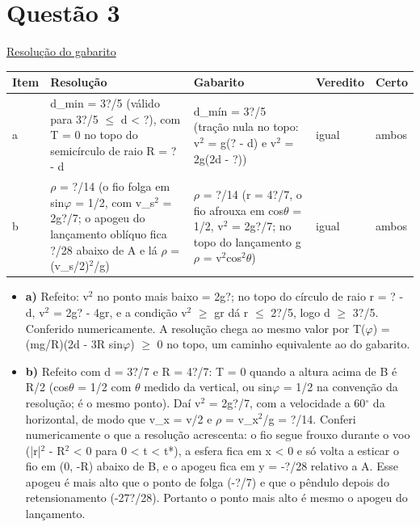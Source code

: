 \documentclass{article}%
\begin{document}
\section*{Questão 3}%
\href{https://poliedroresolve.sistemapoliedro.com.br/vestibulares/ime/2026/ime-2-fase-dia-2-24-10-2025-2-fase-dia-2/dissertativa-3-fisica-2-fase-dia-2-ime-2026}{Resolução do gabarito}\par\smallskip%
\begin{longtable}{@{}p{} p{} p{} p{} p{}@{}}\toprule Item & Resolução & Gabarito & Veredito & Certo \\ \midrule
a & d\_min = 3?/5 (válido para 3?/5 $\leq$ d < ?), com T = 0 no topo do semicírculo de raio R = ? - d & d\_mín = 3?/5 (tração nula no topo: v$^2$ = g(? - d) e v$^2$ = 2g(2d - ?)) & igual & ambos \\
b & $\rho$ = ?/14 (o fio folga em sin$\varphi$ = 1/2, com v\_s$^2$ = 2g?/7; o apogeu do lançamento oblíquo fica ?/28 abaixo de A e lá $\rho$ = (v\_s/2)$^2$/g) & $\rho$ = ?/14 (r = 4?/7, o fio afrouxa em cos$\theta$ = 1/2, v$^2$ = 2g?/7; no topo do lançamento g$\rho$ = v$^2$cos$^2$$\theta$) & igual & ambos \\
\bottomrule\end{longtable}%
\begin{itemize}%
\item%
\textbf{a)} Refeito: v$^2$ no ponto mais baixo = 2g?; no topo do círculo de raio r = ? - d, v$^2$ = 2g? - 4gr, e a condição v$^2$ $\geq$ gr dá r $\leq$ 2?/5, logo d $\geq$ 3?/5. Conferido numericamente. A resolução chega ao mesmo valor por T($\varphi$) = (mg/R)(2d - 3R sin$\varphi$) $\geq$ 0 no topo, um caminho equivalente ao do gabarito.%
\item%
\textbf{b)} Refeito com d = 3?/7 e R = 4?/7: T = 0 quando a altura acima de B é R/2 (cos$\theta$ = 1/2 com $\theta$ medido da vertical, ou sin$\varphi$ = 1/2 na convenção da resolução; é o mesmo ponto). Daí v$^2$ = 2g?/7, com a velocidade a 60$^\circ$ da horizontal, de modo que v\_x = v/2 e $\rho$ = v\_x$^2$/g = ?/14. Conferi numericamente o que a resolução acrescenta: o fio segue frouxo durante o voo (|r|$^2$ - R$^2$ < 0 para 0 < t < t*), a esfera fica em x < 0 e só volta a esticar o fio em (0, -R) abaixo de B, e o apogeu fica em y = -?/28 relativo a A. Esse apogeu é mais alto que o ponto de folga (-?/7) e que o pêndulo depois do retensionamento (-27?/28). Portanto o ponto mais alto é mesmo o apogeu do lançamento.%
\end{itemize}%
\end{document}
